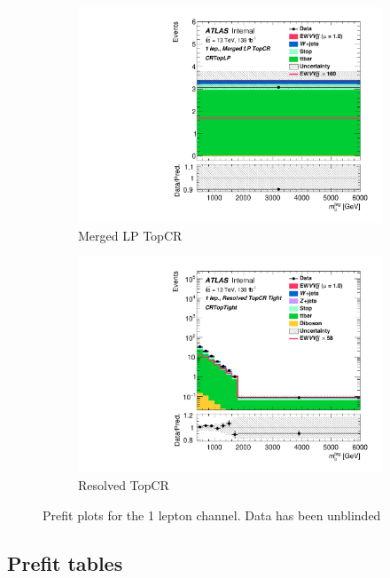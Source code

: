 \begin{figure}[ht]
\begin{subfigure}[b]{0.32\textwidth}
        \includegraphics[width=\textwidth]{figures/FitResults/prefit/Region_disttagMjj_DCRTopLP_BMin0_J0_incJet1_L1_T0_incFat1_Y6051_incTag1_Fat1_Prefit.pdf}
        \caption{Merged LP TopCR}
    \end{subfigure}
    \begin{subfigure}[b]{0.32\textwidth}
        \includegraphics[width=\textwidth]{figures/FitResults/prefit/Region_disttagMjj_DCRTopTight_BMin0_T0_Y6051_incTag1_J2_L1_incJet1_Prefitlog.pdf}
        \caption{Resolved TopCR}
    \end{subfigure}
    \caption{Prefit plots for the 1 lepton channel. Data has been unblinded}
    \label{fig:fit_1lep_prefit}
\end{figure}

\clearpage
\subsection{Prefit tables}

